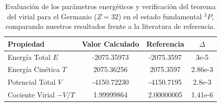 \documentclass[12pt,a4paper]{book}
\begin{document}

\begin{table}[htbp]
    \centering
    \caption{Evaluación de los parámetros energéticos y verificación del teorema del virial para el Germanio ($Z=32$) en el estado fundamental $^{3}P$, comparando nuestros resultados frente a la literatura de referencia.}
    \label{tab:resultados_energia}
    \begin{tabular}{
        l
        S[table-format=-4.8]
        S[table-format=-4.8]
        S[table-format=1.2e-1]
    }
        \toprule
        {\textbf{Propiedad}} & {\textbf{Valor Calculado}} & {\textbf{Referencia}} & {$\Delta$} \\
        \midrule
        Energía Total $E$ & -2075.35973 & -2075.3597 & 3e-5 \\
        Energía Cinética $T$ & 2075.36256 & 2075.3597 & 2.86e-3 \\
        Potencial Total $V$ & -4150.72230 & -4150.7195 & 2.8e-3 \\
        Cociente Virial $-V/T$ & 1.99999864 & 2.00000005 & 1.41e-6 \\
        \bottomrule
    \end{tabular}
\end{table}
\end{document}
